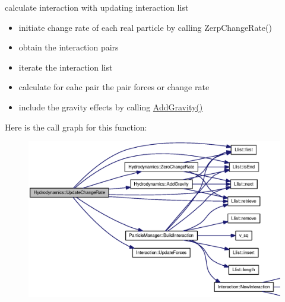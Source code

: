 calculate interaction with updating interaction list 



\begin{itemize}
\item initiate change rate of each real particle by calling ZerpChangeRate()\end{itemize}


\begin{itemize}
\item obtain the interaction pairs\end{itemize}


\begin{itemize}
\item iterate the interaction list\end{itemize}


\begin{itemize}
\item calculate for eahc pair the pair forces or change rate\end{itemize}


\begin{itemize}
\item include the gravity effects by calling \hyperlink{classHydrodynamics_abdebac769f07f2500c21689fafa2981}{AddGravity()} \end{itemize}


Here is the call graph for this function:\nopagebreak
\begin{figure}[H]
\begin{center}
\leavevmode
\includegraphics[width=363pt]{classHydrodynamics_22df8569d81c4c363029efac143ddb26_cgraph}
\end{center}
\end{figure}


